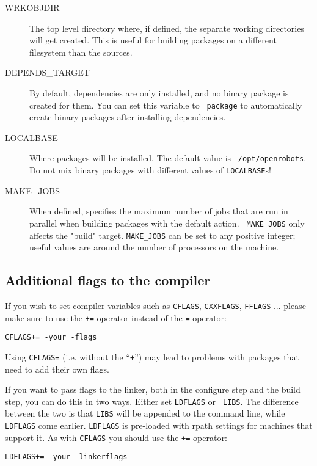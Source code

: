 \begin{description}
   \item[WRKOBJDIR] The top level   directory where, if defined,  the  separate
   working directories will get created.  This is useful for building  packages
   on a different filesystem than the \robotpkg sources.

   \item[DEPENDS\_TARGET] By default,  dependencies are only installed,  and no
   binary package is  created  for them. You  can  set  this variable  to  {\tt
   package}   to   automatically  create    binary  packages   after installing
   dependencies.

   \item[LOCALBASE] Where packages will be installed. The default value is {\tt
   /opt/openrobots}.  Do not  mix     binary  packages with    different values
   of {\tt LOCALBASE}s!

   \item[MAKE\_JOBS] When defined, specifies the maximum number of jobs that
   are run in parallel when building packages with the default action. {\tt
   MAKE\_JOBS} only affects the "build" target. {\tt MAKE\_JOBS} can be set to
   any positive integer; useful values are around the number of processors on
   the machine.


\end{description}


\subsection{Additional flags to the compiler} %

If you wish  to set compiler variables   such as {\tt CFLAGS},  {\tt CXXFLAGS},
{\tt FFLAGS} ... please make sure to use  the {\tt +=}  operator instead of the
{\tt {=}} operator:

\begin{verbatim}
CFLAGS+= -your -flags
\end{verbatim}

Using {\tt CFLAGS=} (i.e.  without the ``{\tt +}'') may  lead to  problems with
packages that need to add their own flags.

If you want  to pass flags  to the linker, both in  the configure  step and the
build step, you  can do this  in  two ways.   Either set {\tt  LDFLAGS} or {\tt
LIBS}.  The difference between  the two is that  {\tt LIBS} will be appended to
the command line, while {\tt LDFLAGS} come earlier. {\tt LDFLAGS} is pre-loaded
with rpath settings   for machines that support  it.  As with {\tt CFLAGS}  you
should use the {\tt +=} operator:

\begin{verbatim}
LDFLAGS+= -your -linkerflags
\end{verbatim}
